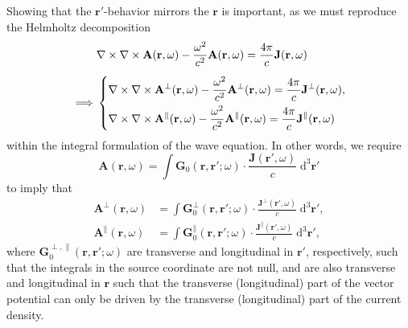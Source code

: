 \documentclass{article}
\begin{document}
Showing that the $\mathbf{r}'$-behavior mirrors the $\mathbf{r}$ is important, as we must reproduce the Helmholtz decomposition
\begin{equation}\label{eq:waveEquationDerivativeHelmholtzDecomp}
\begin{split}
&\nabla\times\nabla\times\mathbf{A}(\mathbf{r},\omega) - \frac{\omega^2}{c^2}\mathbf{A}(\mathbf{r},\omega) = \frac{4\pi}{c}\mathbf{J}(\mathbf{r},\omega)\\[0.5em]
\implies&
\begin{dcases}
\nabla\times\nabla\times\mathbf{A}^\perp(\mathbf{r},\omega) - \frac{\omega^2}{c^2}\mathbf{A}^\perp(\mathbf{r},\omega) = \frac{4\pi}{c}\mathbf{J}^\perp(\mathbf{r},\omega),\\
\nabla\times\nabla\times\mathbf{A}^\parallel(\mathbf{r},\omega) - \frac{\omega^2}{c^2}\mathbf{A}^\parallel(\mathbf{r},\omega) = \frac{4\pi}{c}\mathbf{J}^\parallel(\mathbf{r},\omega)
\end{dcases}
\end{split}
\end{equation}
within the integral formulation of the wave equation. In other words, we require
\begin{equation}
\mathbf{A}(\mathbf{r},\omega) = \int\mathbf{G}_0(\mathbf{r},\mathbf{r}';\omega)\cdot\frac{\mathbf{J}(\mathbf{r}',\omega)}{c}\;\mathrm{d}^3\mathbf{r}'
\end{equation}
to imply that
\begin{equation}\label{eq:waveEquationIntegralHelmholtzDecomp}
\begin{split}
\mathbf{A}^\perp(\mathbf{r},\omega) &= \int\mathbf{G}_0^\perp(\mathbf{r},\mathbf{r}';\omega)\cdot\frac{\mathbf{J}^\perp(\mathbf{r}',\omega)}{c}\;\mathrm{d}^3\mathbf{r}',\\
\mathbf{A}^\parallel(\mathbf{r},\omega) &= \int\mathbf{G}_0^\parallel(\mathbf{r},\mathbf{r}';\omega)\cdot\frac{\mathbf{J}^\parallel(\mathbf{r}',\omega)}{c}\;\mathrm{d}^3\mathbf{r}',
\end{split}
\end{equation}
where $\mathbf{G}_0^{\perp,\parallel}(\mathbf{r},\mathbf{r}';\omega)$ are transverse and longitudinal in $\mathbf{r}'$, respectively, such that the integrals in the source coordinate are not null, and are also transverse and longitudinal in $\mathbf{r}$ such that the transverse (longitudinal) part of the vector potential can only be driven by the transverse (longitudinal) part of the current density.
\end{document}

